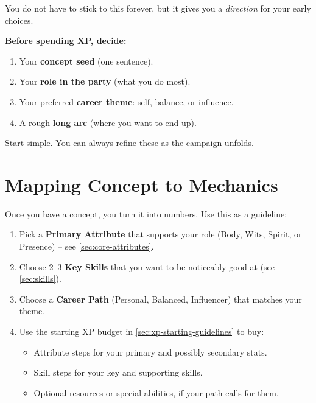 You do not have to stick to this forever, but it gives you a \emph{direction}
for your early choices.

\begin{tcolorbox}[colback=blue!5!white,colframe=blue!75!black,title=Character Career Checklist,fonttitle=\bfseries,breakable]
\textbf{Before spending XP, decide:}
\begin{enumerate}
  \item Your \textbf{concept seed} (one sentence).
  \item Your \textbf{role in the party} (what you do most).
  \item Your preferred \textbf{career theme}: self, balance, or influence.
  \item A rough \textbf{long arc} (where you want to end up).
\end{enumerate}
Start simple. You can always refine these as the campaign unfolds.
\end{tcolorbox}


\section{Mapping Concept to Mechanics}
\label{sec:xp-mapping}

Once you have a concept, you turn it into numbers. Use this as a guideline:

\begin{enumerate}
  \item Pick a \textbf{Primary Attribute} that supports your role
    (Body, Wits, Spirit, or Presence) -- see \ref{sec:core-attributes}.
  \item Choose 2--3 \textbf{Key Skills} that you want to be noticeably good at
    (see \ref{sec:skills}).
  \item Choose a \textbf{Career Path} (Personal, Balanced, Influencer) that matches
        your theme.
  \item Use the starting XP budget in \ref{sec:xp-starting-guidelines} to buy:
    \begin{itemize}
      \item Attribute steps for your primary and possibly secondary stats.
      \item Skill steps for your key and supporting skills.
      \item Optional resources or special abilities, if your path calls for them.
    \end{itemize}
\end{enumerate}

